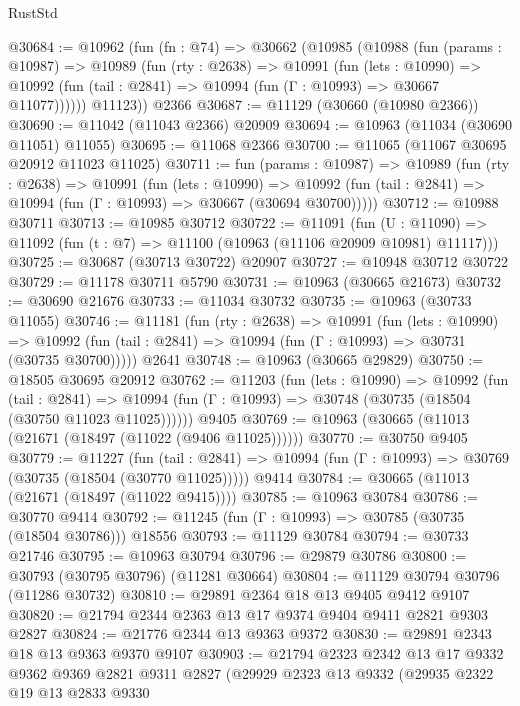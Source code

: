 \begin{lexlean}{RustStd}
\begin{coremodule}
@30684 := @10962
    (fun (fn : @74) =>
    @30662
      (@10985
        (@10988
          (fun (params : @10987) =>
          @10989
            (fun (rty : @2638) =>
            @10991
              (fun (lets : @10990) =>
              @10992 (fun (tail : @2841) => @10994 (fun (Γ : @10993) => @30667 @11077))))))
        @11123))
    @2366
@30687 := @11129 (@30660 (@10980 @2366))
@30690 := @11042 (@11043 @2366) @20909
@30694 := @10963 (@11034 (@30690 @11051) @11055)
@30695 := @11068 @2366
@30700 := @11065 (@11067 @30695 @20912 @11023 @11025)
@30711 := fun (params : @10987) =>
  @10989
    (fun (rty : @2638) =>
    @10991
      (fun (lets : @10990) =>
      @10992 (fun (tail : @2841) => @10994 (fun (Γ : @10993) => @30667 (@30694 @30700)))))
@30712 := @10988 @30711
@30713 := @10985 @30712
@30722 := @11091
    (fun (U : @11090) => @11092 (fun (t : @7) => @11100 (@10963 (@11106 @20909 @10981) @11117)))
@30725 := @30687 (@30713 @30722) @20907
@30727 := @10948 @30712 @30722
@30729 := @11178 @30711 @5790
@30731 := @10963 (@30665 @21673)
@30732 := @30690 @21676
@30733 := @11034 @30732
@30735 := @10963 (@30733 @11055)
@30746 := @11181
    (fun (rty : @2638) =>
    @10991
      (fun (lets : @10990) =>
      @10992 (fun (tail : @2841) => @10994 (fun (Γ : @10993) => @30731 (@30735 @30700)))))
    @2641
@30748 := @10963 (@30665 @29829)
@30750 := @18505 @30695 @20912
@30762 := @11203
    (fun (lets : @10990) =>
    @10992
      (fun (tail : @2841) =>
      @10994 (fun (Γ : @10993) => @30748 (@30735 (@18504 (@30750 @11023 @11025))))))
    @9405
@30769 := @10963 (@30665 (@11013 (@21671 (@18497 (@11022 (@9406 @11025))))))
@30770 := @30750 @9405
@30779 := @11227
    (fun (tail : @2841) => @10994 (fun (Γ : @10993) => @30769 (@30735 (@18504 (@30770 @11025)))))
    @9414
@30784 := @30665 (@11013 (@21671 (@18497 (@11022 @9415))))
@30785 := @10963 @30784
@30786 := @30770 @9414
@30792 := @11245 (fun (Γ : @10993) => @30785 (@30735 (@18504 @30786))) @18556
@30793 := @11129 @30784
@30794 := @30733 @21746
@30795 := @10963 @30794
@30796 := @29879 @30786
@30800 := @30793 (@30795 @30796) (@11281 @30664)
@30804 := @11129 @30794 @30796 (@11286 @30732)
@30810 := @29891 @2364 @18 @13 @9405 @9412 @9107
@30820 := @21794 @2344 @2363 @13 @17 @9374 @9404 @9411 @2821 @9303 @2827
@30824 := @21776 @2344 @13 @9363 @9372
@30830 := @29891 @2343 @18 @13 @9363 @9370 @9107
@30903 := @21794
    @2323
    @2342
    @13
    @17
    @9332
    @9362
    @9369
    @2821
    @9311
    @2827
    (@29929
      @2323
      @13
      @9332
      (@29935
        @2322
        @19
        @13
        @2833
        @9330

\end{coremodule}
\end{lexlean}
